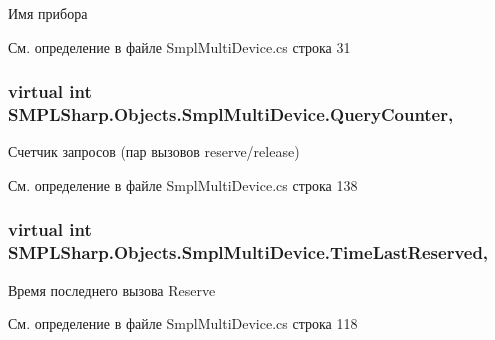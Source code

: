 Имя прибора 



См. определение в файле Smpl\-Multi\-Device.\-cs строка 31

\hypertarget{class_s_m_p_l_sharp_1_1_objects_1_1_smpl_multi_device_a1d76170364b223e8e36d93ae178ab915}{
\subsubsection[{Query\-Counter}]{\setlength{\rightskip}{0pt plus 5cm}virtual int S\-M\-P\-L\-Sharp.\-Objects.\-Smpl\-Multi\-Device.\-Query\-Counter\hspace{0.3cm}{\ttfamily [get]}, {\ttfamily [set]}}}\label{d8/d23/class_s_m_p_l_sharp_1_1_objects_1_1_smpl_multi_device_a1d76170364b223e8e36d93ae178ab915}


Счетчик запросов (пар вызовов reserve/release) 



См. определение в файле Smpl\-Multi\-Device.\-cs строка 138

\hypertarget{class_s_m_p_l_sharp_1_1_objects_1_1_smpl_multi_device_a2194a701f0588035a4d3365211a23b3b}{
\subsubsection[{Time\-Last\-Reserved}]{\setlength{\rightskip}{0pt plus 5cm}virtual int S\-M\-P\-L\-Sharp.\-Objects.\-Smpl\-Multi\-Device.\-Time\-Last\-Reserved\hspace{0.3cm}{\ttfamily [get]}, {\ttfamily [set]}}}\label{d8/d23/class_s_m_p_l_sharp_1_1_objects_1_1_smpl_multi_device_a2194a701f0588035a4d3365211a23b3b}


Время последнего вызова Reserve 



См. определение в файле Smpl\-Multi\-Device.\-cs строка 118


